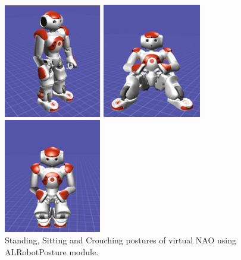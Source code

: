 \begin{figure}
	\centering 
	\begin{minipage}
		{.3 
		\textwidth} \centering 
		\includegraphics[height=5cm]{figures/content/nao-stand.jpg} 
	\end{minipage}
	\begin{minipage}
		{.3 
		\textwidth} \centering 
		\includegraphics[height=5cm]{figures/content/nao-sit.jpg} 
	\end{minipage}
	\begin{minipage}
		{.3 
		\textwidth} \centering 
		\includegraphics[height=5cm]{figures/content/nao-crouch.jpg} 
	\end{minipage}
	\caption{Standing, Sitting and Crouching postures of virtual NAO using ALRobotPosture module. \cite{8}} \label{fg:nao:motion} 
\end{figure}
